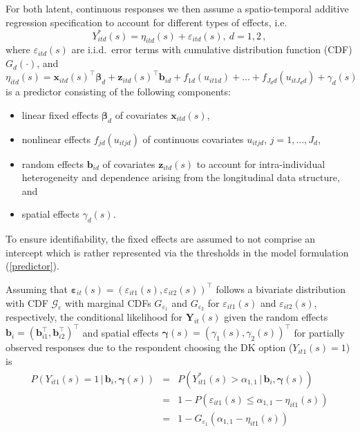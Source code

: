 \documentclass[submit]{smj}
\begin{document}
For both latent, continuous responses we then assume a spatio-temporal additive regression specification to account for different types of effects, i.e.
\begin{equation}\label{eq:yhelp}
 Y^*_{itd}(s) = \eta_{itd}(s) + \varepsilon_{itd}(s), \ d=1,2\,,
\end{equation}
where $\varepsilon_{itd}(s)$ are i.i.d.\ error terms with cumulative distribution function (CDF) $G_d(\cdot)$, and 
\begin{equation}\label{predictor}
 \eta_{itd}(s) = \bm{x}_{itd}(s)^{\top}\bm{\beta}_d +  
                 \bm{z}_{itd}(s)^{\top}\bm{b}_{id} + 
                 f_{1d}(u_{it1d}) + \ldots + f_{J_dd}(u_{itJ_dd}) + 
                 \gamma_d(s)
\end{equation}
is a predictor consisting of the following components:
\begin{itemize}
    \item linear fixed effects $\bm{\beta}_d$ of covariates $\bm{x}_{itd}(s)$,
    \item nonlinear effects $f_{jd}(u_{itjd})$ of continuous covariates $u_{itjd}$, $j=1,\ldots,J_d$,
    \item random effects $\bm{b}_{id}$ of covariates $\bm{z}_{itd}(s)$ to account for intra-individual heterogeneity and dependence arising from the longitudinal data structure, and
    \item spatial effects $\gamma_d(s)$.
\end{itemize}
To ensure identifiability, the fixed effects are assumed to not comprise an intercept which is rather represented via the thresholds in the model formulation (\ref{predictor}).\bigskip

Assuming that $ \pmb{\varepsilon}_{it}(s)=(\varepsilon_{it1}(s),\varepsilon_{it2}(s))^\top$ follows a bivariate distribution with CDF $\mathcal{G}_\varepsilon$ with marginal CDFs $G_{\varepsilon_1}$ and $G_{\varepsilon_2}$ for $\varepsilon_{it1}(s)$ and $\varepsilon_{it2}(s)$, respectively, the conditional likelihood for $\pmb{Y}_{it}(s)$ given the random effects $\bm{b}_i=(\bm{b}_{i1}^{\top},\bm{b}_{i2}^{\top})^{\top}$ and spatial effects $\pmb{\gamma}(s) = (\gamma_1(s),\gamma_2(s))^{\top}$ for partially observed responses due to the respondent choosing the DK option ($Y_{it1}(s)=1$) is  
\begin{eqnarray*}
    P(Y_{it1}(s)=1\,|\,\pmb{b}_i,\pmb{\gamma}(s)) &=& P(Y_{it1}^*(s) > \alpha_{1,1}\,|\,\pmb{b}_i,\pmb{\gamma}(s))\\
    &=& 1-P(\varepsilon_{it1}(s)\le \alpha_{1,1} - \eta_{it1}(s))\\
    &=& 1-G_{\varepsilon_1}(\alpha_{1,1}-\eta_{it1}(s))
\end{eqnarray*}
\end{document}
